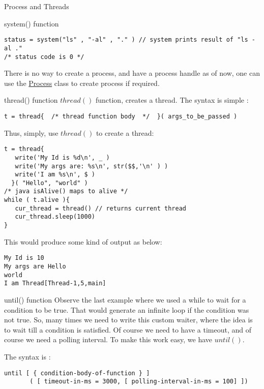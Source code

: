 \begin{section}{Process and Threads}
\begin{subsection}{system() function}
\begin{lstlisting}[style=JexlStyle]
status = system("ls" , "-al" , "." ) // system prints result of "ls -al ."
/* status code is 0 */
\end{lstlisting}

There is no way to create a process, and have a process handle
as of now, one can use the \href{https://docs.oracle.com/javase/8/docs/api/java/lang/Process.html}{Process} class
to create process if required.

\end{subsection}

\begin{subsection}{thread() function}
$thread()$ function, creates a thread.
The syntax is simple :
\begin{lstlisting}[style=JexlStyle]
t = thread{  /* thread function body  */  }( args_to_be_passed )
\end{lstlisting}

Thus, simply, use $thread()$ to create a thread:

\begin{lstlisting}[style=JexlStyle]
t = thread{  
   write('My Id is %d\n', _ )
   write('My args are: %s\n', str($$,'\n' ) )
   write('I am %s\n', $ )
  }( "Hello", "world" )
/* java isAlive() maps to alive */
while ( t.alive ){
   cur_thread = thread() // returns current thread 
   cur_thread.sleep(1000)
}     
\end{lstlisting}
This would produce some kind of output as below:

\begin{lstlisting}[style=all]
My Id is 10
My args are Hello
world
I am Thread[Thread-1,5,main]
\end{lstlisting}

\end{subsection}

\begin{subsection}{until() function}
Observe the last example where we used a while to wait for a condition to be true.
That would generate an infinite loop if the condition was not true.
So, many times we need to write this custom waiter, where the idea is to wait till a condition is satisfied. 
Of course we need to have a timeout, and of course we need a polling interval. 
To make this work easy, we have $until()$. 

The syntax is :

\begin{lstlisting}[style=JexlStyle]
until [ { condition-body-of-function } ]
       ( [ timeout-in-ms = 3000, [ polling-interval-in-ms = 100] ]) 
\end{lstlisting}       


\end{subsection}
\end{section}
